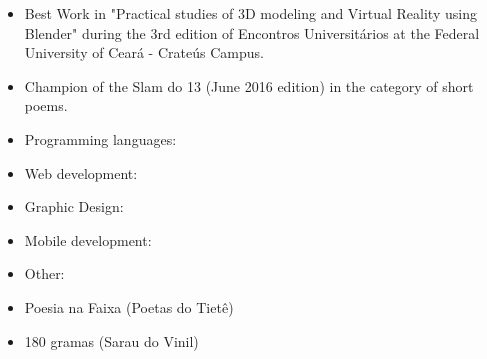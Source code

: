 \begin{itemize}
\item Best Work in "Practical studies of 3D modeling and Virtual Reality using Blender" during the 3rd edition of Encontros Universitários at the Federal University of Ceará - Crateús Campus.
\smallskip
\item Champion of the Slam do 13 (June 2016 edition) in the category of short poems.
\end{itemize}

\begin{itemize}
\item Programming languages:
\end{itemize}

\smallskip

\begin{itemize}
\item Web development:
\end{itemize}

\smallskip

\begin{itemize}
\item Graphic Design:
\end{itemize}

\smallskip

\begin{itemize}
\item Mobile development:
\end{itemize}

\smallskip

\begin{itemize}
\item Other:
\end{itemize}

\vspace{2 mm}

\smallskip
{}
\smallskip
{}
\begin{itemize}
\item Poesia na Faixa (Poetas do Tietê)
\item 180 gramas (Sarau do Vinil)
\end{itemize}

